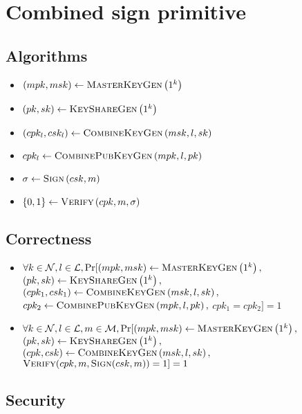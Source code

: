 \section{Combined sign primitive}
  \subsection{Algorithms}
    \begin{itemize}
      \item $\left(mpk, msk\right) \gets \textsc{MasterKeyGen}\left(1^k\right)$
      \item $\left(pk, sk\right) \gets \textsc{KeyShareGen}\left(1^k\right)$
      \item $\left(cpk_l, csk_l\right) \gets \textsc{CombineKeyGen}\left(msk, l,
      sk\right)$
      \item $cpk_l \gets \textsc{CombinePubKeyGen}\left(mpk, l, pk\right)$
      \item $\sigma \gets \textsc{Sign}\left(csk, m\right)$
      \item $\left\{0, 1\right\} \gets \textsc{Verify}\left(cpk, m,
      \sigma\right)$
    \end{itemize}

  \subsection{Correctness}
    \begin{itemize}
      \item $\forall k \in \mathcal{N}, l \in \mathcal{L},
      \Pr[(mpk, msk) \gets \textsc{MasterKeyGen}\left(1^k\right),$
      $\left(pk, sk\right) \gets \textsc{KeyShareGen}\left(1^k\right),$
      $\left(cpk_1, csk_1\right) \gets \textsc{CombineKeyGen}\left(msk, l,
      sk\right),$ \\
      $cpk_2 \gets \textsc{CombinePubKeyGen}\left(mpk, l, pk\right),$
      $cpk_1 = cpk_2] = 1$

      \item $\forall k \in \mathcal{N}, l \in \mathcal{L}, m \in \mathcal{M},
      \Pr[(mpk, msk) \gets \textsc{MasterKeyGen}\left(1^k\right),$
      $\left(pk, sk\right) \gets \textsc{KeyShareGen}\left(1^k\right),$
      $\left(cpk, csk\right) \gets \textsc{CombineKeyGen}\left(msk, l,
      sk\right),$
      $\textsc{Verify}(cpk, m, \textsc{Sign}(csk, m)) = 1] = 1$
    \end{itemize}

  \subsection{Security}
